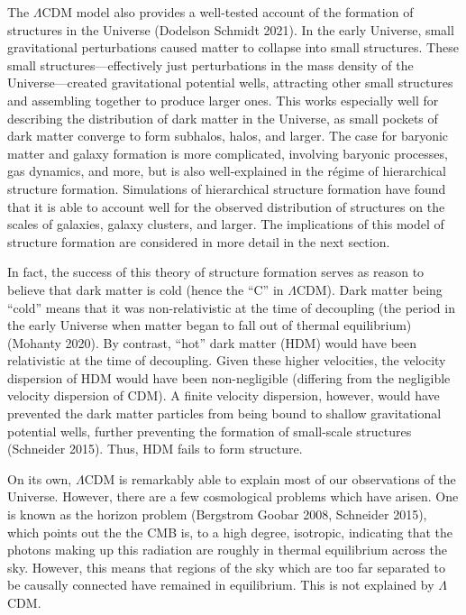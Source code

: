 The \(\Lambda\)CDM model also provides a well-tested account of the
formation of structures in the Universe (Dodelson Schmidt 2021). In the
early Universe, small gravitational perturbations caused matter to
collapse into small structures. These small structures---effectively
just perturbations in the mass density of the Universe---created
gravitational potential wells, attracting other small structures and
assembling together to produce larger ones. This works especially well
for describing the distribution of dark matter in the Universe, as small
pockets of dark matter converge to form subhalos, halos, and larger. The
case for baryonic matter and galaxy formation is more complicated,
involving baryonic processes, gas dynamics, and more, but is also
well-explained in the régime of hierarchical structure formation.
Simulations of hierarchical structure formation have found that it is
able to account well for the observed distribution of structures on the
scales of galaxies, galaxy clusters, and larger. The implications of
this model of structure formation are considered in more detail in the
next section.

In fact, the success of this theory of structure formation serves as
reason to believe that dark matter is cold (hence the ``C'' in
\(\Lambda\)CDM). Dark matter being ``cold'' means that it was
non-relativistic at the time of decoupling (the period in the early
Universe when matter began to fall out of thermal equilibrium) (Mohanty
2020). By contrast, ``hot'' dark matter (HDM) would have been
relativistic at the time of decoupling. Given these higher velocities,
the velocity dispersion of HDM would have been non-negligible (differing
from the negligible velocity dispersion of CDM). A finite velocity
dispersion, however, would have prevented the dark matter particles from
being bound to shallow gravitational potential wells, further preventing
the formation of small-scale structures (Schneider 2015). Thus, HDM
fails to form structure.

On its own, \(\Lambda\)CDM is remarkably able to explain most of our
observations of the Universe. However, there are a few cosmological
problems which have arisen. One is known as the horizon problem
(Bergstrom Goobar 2008, Schneider 2015), which points out the the CMB
is, to a high degree, isotropic, indicating that the photons making up
this radiation are roughly in thermal equilibrium across the sky.
However, this means that regions of the sky which are too far separated
to be causally connected have remained in equilibrium. This is not
explained by \(\Lambda\)CDM.

